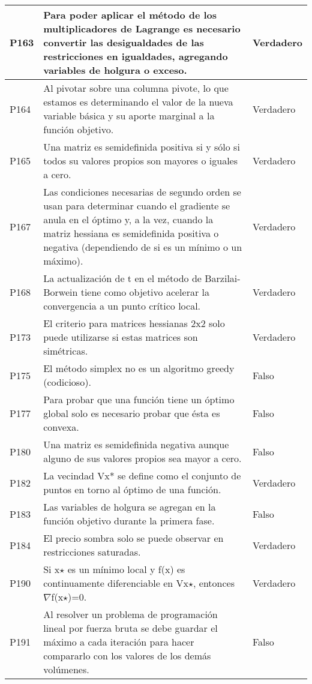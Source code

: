 \documentclass{article}
\begin{document}
\begin{longtable}{|p{1.5cm}|p{14cm}|p{2cm}|}
P163 & Para poder aplicar el método de los multiplicadores de Lagrange es necesario convertir las desigualdades de las restricciones en igualdades, agregando variables de holgura o exceso. & Verdadero \\ \hline
P164 & Al pivotar sobre una columna pivote, lo que estamos es determinando el valor de la nueva variable básica y su aporte marginal a la función objetivo. & Verdadero \\ \hline
P165 & Una matriz es semidefinida positiva si y sólo si todos su valores propios son mayores o iguales a cero. & Verdadero \\ \hline
P167 & Las condiciones necesarias de segundo orden se usan para determinar cuando el gradiente se anula en el óptimo y, a la vez, cuando la matriz hessiana es semidefinida positiva o negativa (dependiendo de si es un mínimo o un máximo). & Verdadero \\ \hline
P168 & La actualización de t en el método de Barzilai-Borwein tiene como objetivo acelerar la convergencia a un punto crítico local. & Verdadero \\ \hline
P173 & El criterio para matrices hessianas 2x2 solo puede utilizarse si estas matrices son simétricas. & Verdadero \\ \hline
P175 & El método simplex no es un algoritmo greedy (codicioso). & Falso \\ \hline
P177 & Para probar que una función tiene un óptimo global solo es necesario probar que ésta es convexa. & Falso \\ \hline
P180 & Una matriz es semidefinida negativa aunque alguno de sus valores propios sea mayor a cero. & Falso \\ \hline
P182 & La vecindad Vx* se define como el conjunto de puntos en torno al óptimo de una función. & Verdadero \\ \hline
P183 & Las variables de holgura se agregan en la función objetivo durante la primera fase. & Falso \\ \hline
P184 & El precio sombra solo se puede observar en restricciones saturadas. & Verdadero \\ \hline
P190 & Si x$\star$ es un mínimo local y f(x) es continuamente diferenciable en Vx$\star$, entonces $\nabla$f(x$\star$)=0. & Verdadero \\ \hline
P191 & Al resolver un problema de programación lineal por fuerza bruta se debe guardar el máximo a cada iteración para hacer compararlo con los valores de los demás volúmenes. & Falso \\ \hline

\end{longtable}
\end{document}
